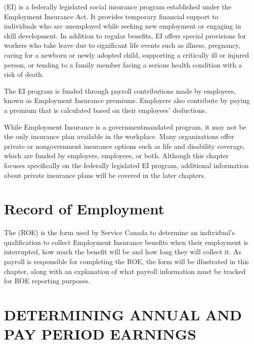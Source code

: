 \documentclass[letterpaper,10pt,english]{sphinxmanual}
\begin{document}
\sphinxAtStartPar
{} (EI) is a federally legislated social insurance program established under the Employment Insurance Act.
It provides temporary financial support to individuals who are unemployed while seeking new employment or engaging in skill
development. In addition to regular benefits, EI offers special provisions for workers who take leave due to significant life
events such as illness, pregnancy, caring for a newborn or newly adopted child, supporting a critically ill or injured person,
or tending to a family member facing a serious health condition with a risk of death.

\sphinxAtStartPar
The EI program is funded through payroll contributions made by employees, known as Employment Insurance premiums. Employers
also contribute by paying a premium that is calculated based on their employees’ deductions.

\sphinxAtStartPar
While Employment Insurance is a government\sphinxhyphen{}mandated program, it may not be the only insurance plan available in the workplace.
Many organizations offer private or non\sphinxhyphen{}government insurance options such as life and disability coverage, which are funded by
employers, employees, or both. Although this chapter focuses specifically on the federally legislated EI program, additional
information about private insurance plans will be covered in the later chapters.


\chapter{Record of Employment}
\label{\detokenize{cpp-and-ei:record-of-employment}}
\sphinxAtStartPar
The  (ROE) is the form used by Service Canada to determine an individual’s qualification to collect
Employment Insurance benefits when their employment is interrupted, how much the benefit will be and how long they will
collect it. As payroll is responsible for completing the ROE, the form will be illustrated in this chapter, along with an
explanation of what payroll information must be tracked for ROE reporting purposes.

\sphinxstepscope


\chapter{DETERMINING ANNUAL AND PAY PERIOD EARNINGS}
\label{\detokenize{compensation:determining-annual-and-pay-period-earnings}}\label{\detokenize{compensation::doc}}
\end{document}

